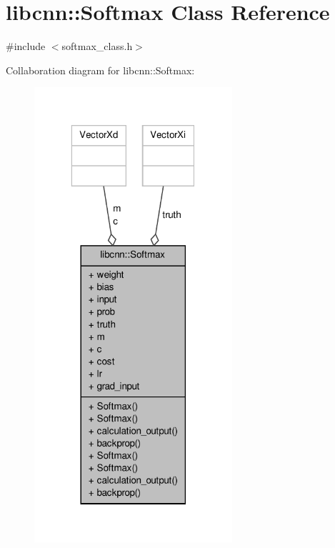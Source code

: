 \hypertarget{classlibcnn_1_1_softmax}{\section{libcnn\-:\-:\-Softmax \-Class \-Reference}
\label{classlibcnn_1_1_softmax}
}


{\ttfamily \#include $<$softmax\-\_\-class.\-h$>$}



\-Collaboration diagram for libcnn\-:\-:\-Softmax\-:
\nopagebreak
\begin{figure}[H]
\begin{center}
\leavevmode
\includegraphics[width=208pt]{classlibcnn_1_1_softmax__coll__graph}
\end{center}
\end{figure}
